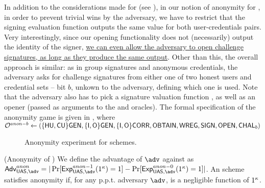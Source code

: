 \iffalse
In addition to the considerations made for \GSAC (see ),
in our notion of anonymity for \UAS,
in order to prevent trivial wins by the adversary, we have to restrict that the
signing evaluation function outputs the same value for both user-credentials
pairs. Very interestingly, since our opening functionality does not
(necessarily) output the identity of the signer, \uline{we can even allow the
  adversary to open challenge signatures, as long as they produce the same
  output}. Other than this, the overall approach is similar: as
in group signatures and anonymous credentials, the adversary asks for challenge
signatures from either one of two honest users and credential sets -- bit $b$,
unkown to the adversary, defining which one is used. Note that the adversary
also has to pick a signature valuation function \feval, as well as an opener
(passed as arguments to the \SIGN and \CHALb oracles). The formal specification
of the anonymity game is given in , where $\mathcal{O}^{anon-b}
\gets (\lbrace\mathsf{HU},\mathsf{CU}\rbrace\mathsf{GEN},\lbrace\mathsf{I},\mathsf{O}\rbrace\mathsf{GEN},\lbrace\mathsf{I},\mathsf{O}\rbrace
\mathsf{CORR},\mathsf{OBTAIN},\mathsf{WREG},\mathsf{SIGN},\mathsf{OPEN},\mathsf{CHAL}_b)$

\begin{figure}[htp!]
  \centering
  \caption{Anonymity experiment for \UAS schemes.}
  \label{fig:exp-uas-anonb}
\end{figure}

\begin{definition}{(Anonymity of \UAS)}
  \label{def:anonymity-uas}  
  We define the advantage \AdvAnon of $\adv$ against \ExpAnonb as
  $\AdvAnon=|\Pr\lbrack\ExpAnono(1^\secpar)=1\rbrack-
  \Pr\lbrack\ExpAnonz(1^\secpar)=1\rbrack|$.
  An \UAS scheme satisfies anonymity if, for any p.p.t. adversary $\adv$,
  \AdvAnon is a negligible function of $1^\kappa$.
\end{definition}

